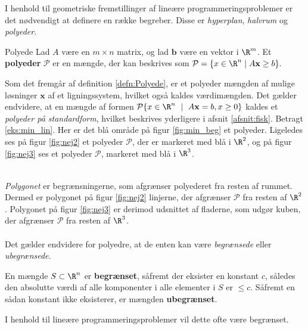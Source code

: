 I henhold til geometriske fremstillinger af lineære programmeringsproblemer er det nødvendigt at definere en række begreber.
Disse er \textit{hyperplan}, \textit{halvrum} og \textit{polyeder}.
%
\begin{defn}{}{Polyede}
Lad $A$ være en $m \times n$ matrix, og lad $\mathbf{b}$ være en vektor i  $\R^m$.
Et \textbf{polyeder} $\mathcal{P}$ er en mængde, der kan beskrives som 
$\mathcal{P} = \{x\in \R^n \mid A\mathbf{x}\geq b\}.$
%
\end{defn}
\noindent
%
Som det fremgår af definition \ref{defn:Polyede}, er et polyeder mængden af mulige løsninger $\mathbf{x}$ af et ligningssystem, hvilket også kaldes værdimængden.
Det gælder endvidere, at en mængde af formen $\mathcal{P} \{x \in \R^n \text{ } \mid \text{ } A\textbf{x} = b,x \geq 0 \}$ kaldes et \textit{polyeder på standardform}, hvilket beskrives yderligere i afsnit \ref{afsnit:fisk}.
%
%
Betragt \ref{eks:min_lin}.
Her er det blå område på figur \ref{fig:min_beg} et polyeder. 
Ligeledes ses på figur \ref{fig:nej2} et polyeder $\mathcal{P}$, der er markeret med blå i $\R^2$, og på figur \ref{fig:nej3} ses et polyeder $\mathcal{P}$, markeret med blå i $\R^3$. 
%
%
\begin{center}
$
\begin{array}{cc}
&

\end{array}
$
\end{center}
%
\textit{Polygonet} er begrænsningerne, som afgrænser polyederet fra resten af rummet. 
Dermed er polygonet på figur \ref{fig:nej2} linjerne, der afgrænser $\mathcal{P}$ fra resten af $\R^2$.
Polygonet på figur \ref{fig:nej3} er derimod udsnittet af fladerne, som udgør kuben, der afgrænser $\mathcal{P}$ fra resten af $\R^3$.
\\\\
%
Det gælder endvidere for polyedre, at de enten kan være \textit{begrænsede} eller \textit{ubegrænsede}.
%
\begin{defn}{}{}
En mængde $S \subset \R^n$ er \textbf{begrænset}, såfremt der eksister en konstant $c$, således den absolutte værdi af alle komponenter i alle elementer i $S$ er $\leq c$. 
Såfremt en sådan konstant ikke eksisterer, er mængden \textbf{ubegrænset}. 
\end{defn}
\noindent
% 
%
%
I henhold til lineære programmeringsproblemer vil dette ofte være begrænset.
